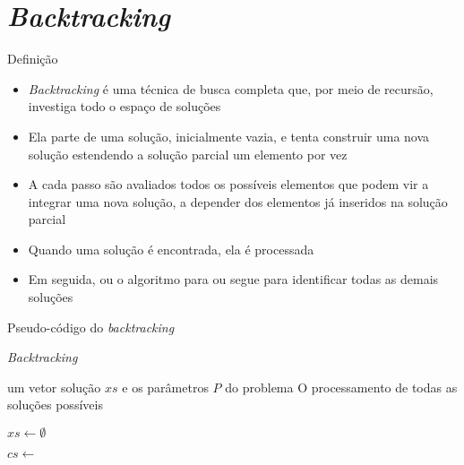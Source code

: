 \section{\it Backtracking}

\begin{frame}[fragile]{Definição}

    \begin{itemize}
        \item \textit{Backtracking} é uma técnica de busca completa que, por meio de recursão,
            investiga todo o espaço de soluções

        \item Ela parte de uma solução, inicialmente vazia, e tenta construir uma nova solução
            estendendo a solução parcial um elemento por vez

        \item A cada passo são avaliados todos os possíveis elementos que podem vir a integrar
            uma nova solução, a depender dos elementos já inseridos na solução parcial

        \item Quando uma solução é encontrada, ela é processada

        \item Em seguida, ou o algoritmo para ou segue para identificar todas as demais soluções

    \end{itemize}

\end{frame}

\begin{frame}[fragile]{Pseudo-código do {\it backtracking}}

    \begin{algorithm}[H]
        \small

        \caption{\it Backtracking}

        \begin{algorithmic}[1]
            \Require um vetor solução $xs$ e os parâmetros $P$ do problema
            \Ensure O processamento de todas as soluções possíveis

            \State $xs \gets \emptyset$
            \State 
 
                    \State {}
                \Else
                    \State $cs \gets $ 

                        \State {}
                        \State {}
                        \State {}
                        \State {}
                        \State {}
                    \EndFor
                \EndIf
            \EndFunction
        \end{algorithmic}
    \end{algorithm}

\end{frame}


